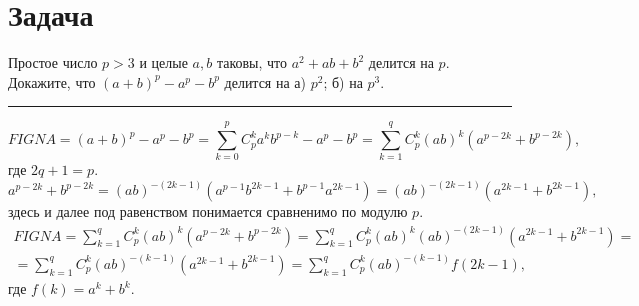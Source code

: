 \section{Задача}

Простое число $p > 3$ и целые $a, b$ таковы, что $a^2 + ab + b^2$ делится на $p$. Докажите, что $(a + b)^p - a^p - b^p$ делится на а) $p^2$; б) на $p^3$.

\hrule

\begin{equation*}
FIGNA = (a + b)^p - a^p - b^p = \sum_{k=0}^p{C_p^k a^k b^{p-k}} - a^p - b^p = \sum_{k=1}^{q}{C_p^k (ab)^k(a^{p-2k} + b^{p - 2k})},
\end{equation*}
где $2q + 1 = p$.
\begin{equation*}
a^{p - 2k} + b^{p - 2k} = (ab)^{-(2k - 1)}(a^{p-1}b^{2k - 1} + b^{p-1}a^{2k - 1}) = (ab)^{-(2k-1)}(a^{2k-1} + b^{2k-1}),
\end{equation*}
здесь и далее под равенством понимается сравненимо по модулю $p$.
\begin{multline*}
FIGNA = \sum_{k=1}^q{C_p^k (ab)^k (a^{p-2k} + b^{p-2k})} = \sum_{k=1}^q{C_p^k (ab)^k (ab)^{-(2k-1)}(a^{2k-1} + b^{2k-1})} = \\
= \sum_{k=1}^q{C_p^k (ab)^{-(k-1)}(a^{2k-1} + b^{2k-1})} = \sum_{k=1}^q{C_p^k (ab)^{-(k-1)} f(2k-1)},
\end{multline*}
где $f(k) = a^{k} + b^{k}$.

